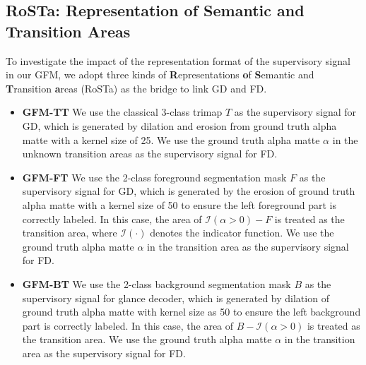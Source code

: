 \documentclass[twocolumn]{svjour3}
\begin{document}
\subsection{RoSTa: Representation of Semantic and Transition Areas}
\label{section:data_presentation}
To investigate the impact of the representation format of the supervisory signal in our GFM, we adopt three kinds of \textbf{R}epresentations \textbf{o}f \textbf{S}emantic and \textbf{T}ransition \textbf{a}reas (RoSTa) as the bridge to link GD and FD.

\begin{itemize}
	\item \textbf{GFM-TT} We use the classical 3-class trimap $T$ as the supervisory signal for GD, which is generated by dilation and erosion from ground truth alpha matte with a kernel size of 25. We use the ground truth alpha matte $\alpha$ in the unknown transition areas as the supervisory signal for FD.
	\item \textbf{GFM-FT} We use the 2-class foreground segmentation mask $F$ as the supervisory signal for GD, which is generated by the erosion of ground truth alpha matte with a kernel size of 50 to ensure the left foreground part is correctly labeled. In this case, the area of $\mathcal{I}\left( \alpha > 0 \right)-F$ is treated as the transition area, where $\mathcal{I}\left( \cdot \right)$ denotes the indicator function. We use the ground truth alpha matte $\alpha$ in the transition area as the supervisory signal for FD.
	\item \textbf{GFM-BT} We use the 2-class background segmentation mask $B$ as the supervisory signal for glance decoder, which is generated by dilation of ground truth alpha matte with kernel size as 50 to ensure the left background part is correctly labeled. In this case, the area of $B - \mathcal{I}\left( \alpha > 0 \right)$ is treated as the transition area. We use the ground truth alpha matte $\alpha$ in the transition area as the supervisory signal for FD.
\end{itemize}
\end{document}
